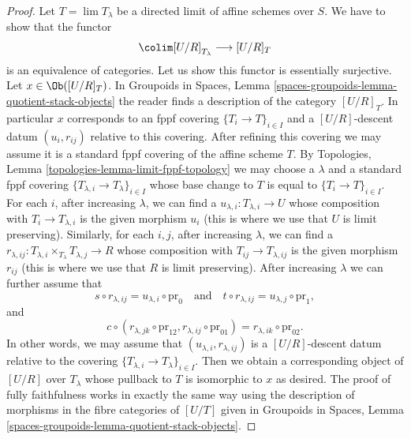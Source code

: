 \begin{proof}
\medskip\noindent
Let $T = \lim T_\lambda$ be a directed limit of affine schemes over $S$.
We have to show that the functor
$$
\colim [U/R]_{T_\lambda} \longrightarrow [U/R]_T
$$
is an equivalence of categories. Let us show this functor is
essentially surjective. Let $x \in \Ob([U/R]_T)$. In
Groupoids in Spaces, Lemma \ref{spaces-groupoids-lemma-quotient-stack-objects}
the reader finds a description of the category $[U/R]_T$.
In particular $x$ corresponds to an fppf covering
$\{T_i \to T\}_{i \in I}$ and a $[U/R]$-descent datum
$(u_i, r_{ij})$ relative to this covering.
After refining this covering we may assume it is a standard
fppf covering of the affine scheme $T$.
By Topologies, Lemma
\ref{topologies-lemma-limit-fppf-topology}
we may choose a $\lambda$ and a standard fppf covering
$\{T_{\lambda, i} \to T_\lambda\}_{i \in I}$ whose base change to $T$
is equal to $\{T_i \to T\}_{i \in I}$.
For each $i$, after increasing $\lambda$, we can find
a $u_{\lambda, i} : T_{\lambda, i} \to U$ whose composition
with $T_i \to T_{\lambda, i}$ is the given morphism $u_i$
(this is where we use that $U$ is limit preserving).
Similarly, for each $i, j$, after increasing $\lambda$, we can find
a $r_{\lambda, ij} : T_{\lambda, i} \times_{T_\lambda} T_{\lambda, j} \to R$
whose composition with $T_{ij} \to T_{\lambda, ij}$ is the given morphism
$r_{ij}$ (this is where we use that $R$ is limit preserving).
After increasing $\lambda$ we can further assume that
$$
s \circ r_{\lambda, ij} = u_{\lambda, i} \circ \text{pr}_0
\quad\text{and}\quad
t \circ r_{\lambda, ij} = u_{\lambda, j} \circ \text{pr}_1,
$$
and
$$
c \circ (r_{\lambda, jk} \circ \text{pr}_{12}, r_{\lambda, ij}
\circ \text{pr}_{01}) = r_{\lambda, ik} \circ \text{pr}_{02}.
$$
In other words, we may assume that $(u_{\lambda, i}, r_{\lambda, ij})$
is a $[U/R]$-descent datum relative to the covering
$\{T_{\lambda, i} \to T_\lambda\}_{i \in I}$.
Then we obtain a corresponding object of $[U/R]$ over $T_\lambda$
whose pullback to $T$ is isomorphic to $x$ as desired.
The proof of fully faithfulness works in exactly the same
way using the description of morphisms
in the fibre categories of $[U/T]$ given in
Groupoids in Spaces, Lemma \ref{spaces-groupoids-lemma-quotient-stack-objects}.
\end{proof}

